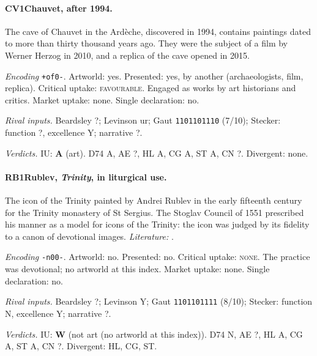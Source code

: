 \paragraph{CV1\enspace Chauvet, after 1994.}
The cave of Chauvet in the Ard\`eche, discovered in 1994, contains paintings dated to more than thirty thousand years ago. They were the subject of a film by Werner Herzog in 2010, and a replica of the cave opened in 2015.\par
\noindent\textit{Encoding} \texttt{+of0-}. Artworld: yes. Presented: yes, by another (archaeologists, film, replica). Critical uptake: \textsc{favourable}. Engaged as works by art historians and critics. Market uptake: none. Single declaration: no.\par
\noindent\textit{Rival inputs.} Beardsley ?; Levinson ur; Gaut \texttt{1101101110} (7/10); Stecker: function ?, excellence Y; narrative ?.\par
\noindent\textit{Verdicts.} IU: \textbf{A} (art). D74 A, AE ?, HL A, CG A, ST A, CN ?. Divergent: none.\par

\paragraph{RB1\enspace Rublev, \emph{Trinity}, in liturgical use.}
The icon of the Trinity painted by Andrei Rublev in the early fifteenth century for the Trinity monastery of St Sergius. The Stoglav Council of 1551 prescribed his manner as a model for icons of the Trinity: the icon was judged by its fidelity to a canon of devotional images. \textit{Literature:} \citet{Belting1994}.\par
\noindent\textit{Encoding} \texttt{-n00-}. Artworld: no. Presented: no. Critical uptake: \textsc{none}. The practice was devotional; no artworld at this index. Market uptake: none. Single declaration: no.\par
\noindent\textit{Rival inputs.} Beardsley ?; Levinson Y; Gaut \texttt{1101101111} (8/10); Stecker: function N, excellence Y; narrative ?.\par
\noindent\textit{Verdicts.} IU: \textbf{W} (not art (no artworld at this index)). D74 N, AE ?, HL A, CG A, ST A, CN ?. Divergent: HL, CG, ST.\par

